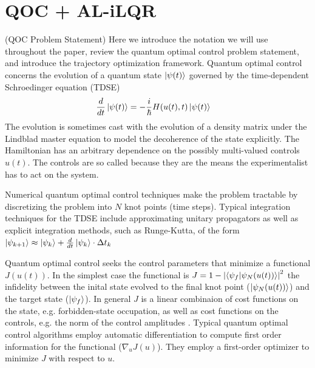 \documentclass[
  amsfonts,
  amsmath,
  tbtags,
  amssymb,
  aps,
  nobibnotes,
  twocolumn,
]{revtex4-2}
\begin{document}
\section{QOC + AL-iLQR}
(QOC Problem Statement) Here we introduce the notation
we will use throughout the paper,
review the quantum optimal control problem statement,
and introduce the trajectory optimization framework.
Quantum optimal control concerns the evolution of
a quantum state $\ket{\psi(t)}$ governed by the time-dependent
Schroedinger equation (TDSE)
\label{eq:tdse}
\begin{align}
  \frac{d}{dt} \ket{\psi(t)} &= -\frac{i}{\hbar} H(u(t), t) \ket{\psi(t)}
\end{align}
The evolution is sometimes cast with the evolution
of a density matrix under the Lindblad master equation to
model the decoherence of the state explicitly. The Hamiltonian
has an arbitrary dependence on the possibly multi-valued controls $u(t)$.
The controls are so called because they are the means the experimentalist has to
act on the system.

Numerical quantum optimal control techniques make
the problem tractable by discretizing the problem into $N$
knot points (time steps). Typical integration techniques for the TDSE include
approximating unitary propagators as well as explicit integration methods,
such as Runge-Kutta, of the form
$\ket{\psi_{k + 1}} \approx \ket{\psi_{k}} + \frac{d}{dt} \ket{\psi_{k}} \cdot \Delta t_{k}$

Quantum optimal control seeks the control
parameters that minimize a functional $J(u(t))$.
In the simplest case the functional is
$J = 1 - {\lvert \braket{\psi_{f} \lvert \psi_{N}(u(t))} \rvert}^{2}$
the infidelity between the inital state evolved
to the final knot point ($\ket{\psi_{N}(u(t))}$)
and the target state ($\ket{\psi_{f}}$). In general
$J$ is a linear combinaion of cost functions on the state, e.g.
forbidden-state occupation, as well as
cost functions on the controls, e.g. the norm of the control amplitudes
\cite{leung2017speedup}. Typical quantum optimal control
algorithms employ automatic differentiation
to compute first order information for the functional ($\nabla_{u} J(u)$).
They employ a first-order optimizer to minimize $J$ with respect to $u$.
\end{document}
